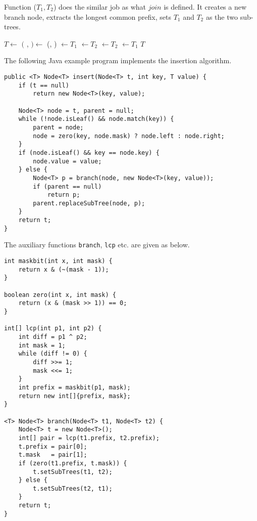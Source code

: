 \documentclass{article}
\begin{document}
Function ($T_1, T_2$) does the similar job as what $join$ is defined.
It creates a new branch node, extracts the longest common prefix, sets $T_1$ and
$T_2$ as the two sub-trees.

\begin{algorithmic}[1]
  \State $T \gets$ 
  \State $($ ,  $) \gets$ (, )
    \State {} $\gets T_1$
    \State {} $\gets T_2$
  \Else
    \State {} $\gets T_2$
    \State {} $\gets T_1$
  \EndIf
  \State \Return $T$
\EndFunction
\end{algorithmic}

The following Java example program implements the insertion algorithm.

\lstset{language=Java}
\begin{lstlisting}
public <T> Node<T> insert(Node<T> t, int key, T value) {
    if (t == null)
        return new Node<T>(key, value);

    Node<T> node = t, parent = null;
    while (!node.isLeaf() && node.match(key)) {
        parent = node;
        node = zero(key, node.mask) ? node.left : node.right;
    }
    if (node.isLeaf() && key == node.key) {
        node.value = value;
    } else {
        Node<T> p = branch(node, new Node<T>(key, value));
        if (parent == null)
            return p;
        parent.replaceSubTree(node, p);
    }
    return t;
}
\end{lstlisting}

The auxiliary functions \texttt{branch}, \texttt{lcp} etc. are given as below.

\begin{lstlisting}
int maskbit(int x, int mask) {
    return x & (~(mask - 1));
}

boolean zero(int x, int mask) {
    return (x & (mask >> 1)) == 0;
}

int[] lcp(int p1, int p2) {
    int diff = p1 ^ p2;
    int mask = 1;
    while (diff != 0) {
        diff >>= 1;
        mask <<= 1;
    }
    int prefix = maskbit(p1, mask);
    return new int[]{prefix, mask};
}

<T> Node<T> branch(Node<T> t1, Node<T> t2) {
    Node<T> t = new Node<T>();
    int[] pair = lcp(t1.prefix, t2.prefix);
    t.prefix = pair[0];
    t.mask   = pair[1];
    if (zero(t1.prefix, t.mask)) {
        t.setSubTrees(t1, t2);
    } else {
        t.setSubTrees(t2, t1);
    }
    return t;
}
\end{lstlisting}
\end{document}

